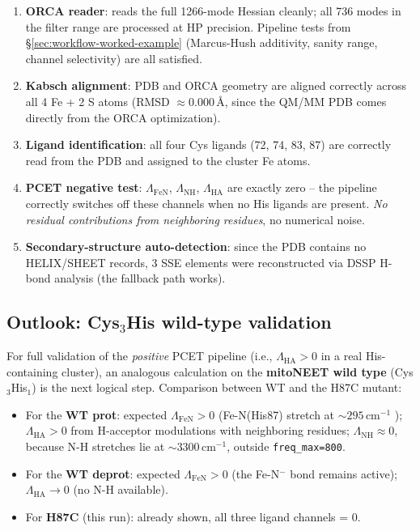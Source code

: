 \documentclass[11pt,a4paper,twoside]{article}
\providecommand{\angstrom}{\text{\AA}}    %
\theoremstyle{remark}
\begin{document}
\begin{enumerate}
  \item \textbf{ORCA reader}: reads the full 1266-mode Hessian
        cleanly; all 736 modes in the filter range are processed
        at HP precision. Pipeline tests from
        \S\ref{sec:workflow-worked-example} (Marcus-Hush
        additivity, sanity range, channel selectivity) are all
        satisfied.
  \item \textbf{Kabsch alignment}: PDB and ORCA geometry are
        aligned correctly across all 4 Fe + 2 S atoms (RMSD
        $\approx 0.000$\,$\angstrom$, since the QM/MM PDB comes
        directly from the ORCA optimization).
  \item \textbf{Ligand identification}: all four Cys ligands
        (72, 74, 83, 87) are correctly read from the PDB and
        assigned to the cluster Fe atoms.
  \item \textbf{PCET negative test}: $\Lambda_\text{FeN}$,
        $\Lambda_\text{NH}$, $\Lambda_\text{HA}$ are exactly zero
        -- the pipeline correctly switches off these channels
        when no His ligands are present. \emph{No residual
        contributions from neighboring residues}, no numerical
        noise.
  \item \textbf{Secondary-structure auto-detection}: since the
        PDB contains no HELIX/SHEET records, 3 SSE elements were
        reconstructed via DSSP H-bond analysis (the fallback
        path works).
\end{enumerate}

\subsection{Outlook: Cys$_3$His wild-type validation}
\label{sec:val-cys3his-wt}

For full validation of the \emph{positive} PCET pipeline (i.e.,
$\Lambda_\text{HA} > 0$ in a real His-containing cluster), an
analogous calculation on the \textbf{mitoNEET wild type}
(Cys$_3$His$_1$) is the next logical step. Comparison between WT
and the H87C mutant:

\begin{itemize}\setlength{\itemsep}{0pt}
  \item For the \textbf{WT prot}: expected $\Lambda_\text{FeN} > 0$
        (Fe-N(His87) stretch at $\sim 295$\,cm$^{-1}$
        \cite{Gee2021}); $\Lambda_\text{HA} > 0$ from H-acceptor
        modulations with neighboring residues;
        $\Lambda_\text{NH} \approx 0$, because N-H stretches lie
        at $\sim 3300$\,cm$^{-1}$, outside
        \texttt{freq\_max=800}.
  \item For the \textbf{WT deprot}: expected
        $\Lambda_\text{FeN} > 0$ (the Fe-N$^-$ bond remains
        active); $\Lambda_\text{HA} \to 0$ (no N-H available).
  \item For \textbf{H87C} (this run): already shown, all three
        ligand channels = 0.
\end{itemize}
\end{document}

